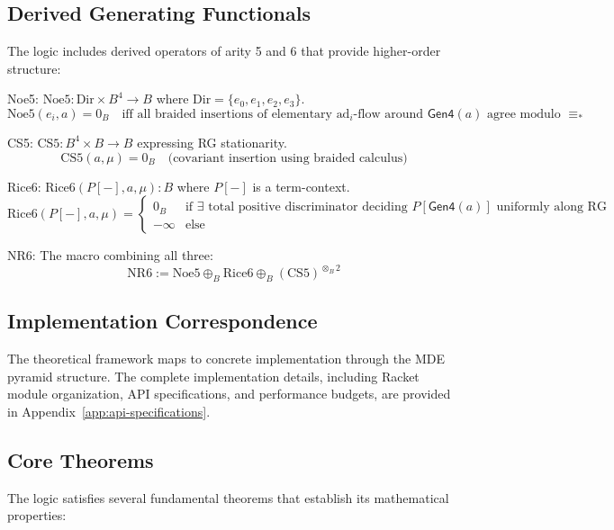 \subsection{Derived Generating Functionals}

The logic includes derived operators of arity 5 and 6 that provide higher-order structure:

\begin{definition}
\label{def:derived-functionals}
Noe5: $\text{Noe5}: \text{Dir} \times B^4 \to B$ where $\text{Dir} = \{e_0, e_1, e_2, e_3\}$.
\[
\text{Noe5}(e_i, a) = 0_B \quad \text{iff all braided insertions of elementary } \text{ad}_i\text{-flow around } \mathsf{Gen4}(a) \text{ agree modulo } \equiv_*
\]

CS5: $\text{CS5}: B^4 \times B \to B$ expressing RG stationarity.
\[
\text{CS5}(a, \mu) = 0_B \quad \text{(covariant insertion using braided calculus)}
\]

Rice6: $\text{Rice6}(P[-], a, \mu): B$ where $P[-]$ is a term-context.
\[
\text{Rice6}(P[-], a, \mu) = \begin{cases}
0_B & \text{if } \exists \text{ total positive discriminator deciding } P[\mathsf{Gen4}(a)] \text{ uniformly along RG} \\
-\infty & \text{else}
\end{cases}
\]

NR6: The macro combining all three:
\[
\text{NR6} := \text{Noe5} \oplus_B \text{Rice6} \oplus_B (\text{CS5})^{\otimes_B 2}
\]
\end{definition}

\subsection{Implementation Correspondence}

The theoretical framework maps to concrete implementation through the MDE pyramid structure. The complete implementation details, including Racket module organization, API specifications, and performance budgets, are provided in Appendix~\ref{app:api-specifications}.

\subsection{Core Theorems}

The logic satisfies several fundamental theorems that establish its mathematical properties:

